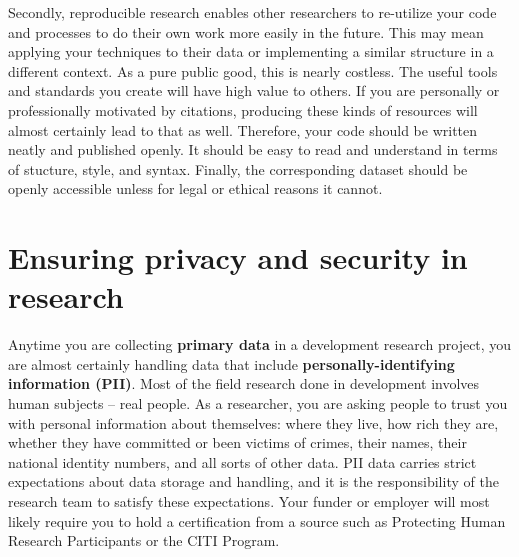 Secondly, reproducible research
enables other researchers to re-utilize your code and processes
to do their own work more easily in the future.
This may mean applying your techniques to their data
or implementing a similar structure in a different context.
As a pure public good, this is nearly costless.
The useful tools and standards you create will have high value to others.
If you are personally or professionally motivated by citations,
producing these kinds of resources will almost certainly lead to that as well.
Therefore, your code should be written neatly and published openly.
It should be easy to read and understand in terms of stucture, style, and syntax.
Finally, the corresponding dataset should be openly accessible
unless for legal or ethical reasons it cannot.


\section{Ensuring privacy and security in research}

Anytime you are collecting \textbf{primary data} in a development research project,
you are almost certainly handling data that include \textbf{personally-identifying information (PII)}.
Most of the field research done in development involves human subjects -- real people.
As a researcher, you are asking people to trust you with personal information about themselves:
where they live, how rich they are, whether they have committed or been victims of crimes,
their names, their national identity numbers, and all sorts of other data.
PII data carries strict expectations about data storage and handling,
and it is the responsibility of the research team to satisfy these expectations.
Your funder or employer will most likely require you to hold a certification from a source
such as Protecting Human Research Participants
or the CITI Program.

